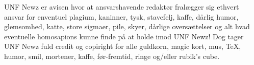 \begin{minipage}[b]{0.95\linewidth}
\begin{center}
\vspace{3mm}

\tiny UNF Newz er avisen hvor at ansvarshavende redaktør fralægger sig ethvert ansvar for enventuel plagium, kaninner, tysk, stavefelj, kaffe, dårlig humor, glemsomhed, katte, store sigmaer, pile, skyer, dårlige oversættelser og alt hvad eventuelle homosapions kunne finde på at holde imod UNF Newz! Dog tager UNF Newz fuld credit og copiright for alle guldkorn, magic kort, mus, TeX, humor, smil, mortener, kaffe, før-fremtid, ringe og/eller rubik's cube.
\end{center}
\end{minipage}

